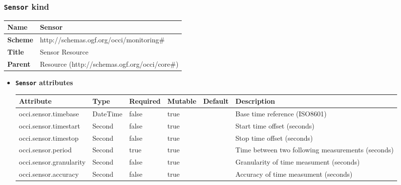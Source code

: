 \subsubsection{\texttt{Sensor} kind}
\begin{center}
\begin{tabular}{|l|l|}
  \hline
  \textbf{Name} & Sensor \\
  \hline  
  \textbf{Scheme} & http://schemas.ogf.org/occi/monitoring\# \\
  \hline
  \textbf{Title} & Sensor Resource \\
  \hline
  \textbf{Parent} & Resource (http://schemas.ogf.org/occi/core\#) \\
  \hline
\end{tabular}
\end{center}
\begin{itemize}
\item \textbf{\texttt{Sensor} attributes}

\begin{tabularx}{\textwidth}{|l|l|p{1.4cm}|p{1.3cm}|l|X|}
  \hline
  \textbf{Attribute} & \textbf{Type} & \textbf{Required} & \textbf{Mutable} & \textbf{Default} & \textbf{Description} \\
  \hline  
  occi.sensor.timebase & DateTime & false & true &  & Base time reference (ISO8601) \\
  \hline
  occi.sensor.timestart & Second & false & true &  & Start time offset (seconds) \\
  \hline
  occi.sensor.timestop & Second & false & true &  & Stop time offset (seconds) \\
  \hline
  occi.sensor.period & Second & true & true &  & Time between two following measurements (seconds) \\
  \hline
  occi.sensor.granularity & Second & false & true &  & Granularity of time measument (seconds) \\
  \hline
  occi.sensor.accuracy & Second & false & true &  & Accuracy of time measument (seconds) \\
  \hline
\end{tabularx}
\end{itemize}


